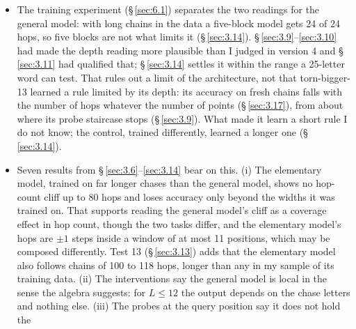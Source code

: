 \documentclass[paper=a4,fontsize=11pt,DIV=11,parskip=half,headings=small,numbers=noendperiod]{scrartcl}
\DeclareRobustCommand{\code}[1]{{\fontseries{m}\ttfamily #1}}
\begin{document}
\begin{itemize}
  25 points, and sparse in long ones. A density argument would need a metric in which “long chain” is far from
  “short chain”. \S\,\ref{sec:3.17} adds a distinction such an argument needs: what the data contain is not what
  the learned rule covers. \code{torn-\allowbreak{}bigger-\allowbreak{}13}’s file contains chains of up to 18
  hops and the model is right on all of them, but its rule extends to fresh chains only up to about 13 hops; the
  fresh-data control, which saw about as few chains of 18 or more hops (10 slots in its whole run), follows
  fresh chains through 10 points to 22 hops. So density of the training sample in (hops, points) is necessary
  for an argument of this kind but not sufficient: the argument has to say which chains the model generalises
  to, and for the original model that is fewer than the data contain.
\item The training experiment (\S\,\ref{sec:6.1}) separates the two readings for the general model: with long
  chains in the data a five-block model gets 24 of 24 hops, so five blocks are not what limits it
  (\S\,\ref{sec:3.14}). \S\,\ref{sec:3.9}–\ref{sec:3.10} had made the depth reading more plausible than I judged
  in version 4 and \S\,\ref{sec:3.11} had qualified that; \S\,\ref{sec:3.14} settles it within the range a
  25-letter word can test. That rules out a limit of the architecture, not that
  \code{torn-\allowbreak{}bigger-\allowbreak{}13} learned a rule limited by its depth: its accuracy on fresh
  chains falls with the number of hops whatever the number of points (\S\,\ref{sec:3.17}), from about where its
  probe staircase stops (\S\,\ref{sec:3.9}). What made it learn a short rule I do not know; the control, trained
  differently, learned a longer one (\S\,\ref{sec:3.14}).
\item Seven results from \S\,\ref{sec:3.6}–\ref{sec:3.14} bear on this. (i) The elementary model, trained on far
  longer chases than the general model, shows no hop-count cliff up to 80 hops and loses accuracy only beyond
  the widths it was trained on. That supports reading the general model’s cliff as a coverage effect in hop
  count, though the two tasks differ, and the elementary model’s hops are $\pm1$ steps inside a window of at
  most 11 positions, which may be composed differently. Test 13 (\S\,\ref{sec:3.13}) adds that the elementary
  model also follows chains of 100 to 118 hops, longer than any in my sample of its training data. (ii) The
  interventions say the general model is local in the sense the algebra suggests: for $L\le12$ the output
  depends on the chase letters and nothing else. (iii) The probes at the query position say it does not hold the

\end{itemize}
\end{document}

